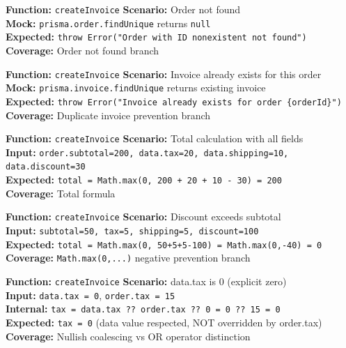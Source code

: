 \documentclass[12pt,a4paper]{report}
\newcommand{\ptwo}{\textbf{\color{p2orange}P2}}
\begin{document}
\begin{tcolorbox}[testbox,title={INV-004 \hfill \ptwo}]
\textbf{Function:} \texttt{createInvoice} \quad \textbf{Scenario:} Order not found \\
\textbf{Mock:} \texttt{prisma.order.findUnique} returns \texttt{null} \\
\textbf{Expected:} \texttt{throw Error("Order with ID nonexistent not found")} \\
\textbf{Coverage:} Order not found branch
\end{tcolorbox}

\begin{tcolorbox}[criticalbox,title={INV-005 \hfill \ptwo\ --- Duplicate Invoice}]
\textbf{Function:} \texttt{createInvoice} \quad \textbf{Scenario:} Invoice already exists for this order \\
\textbf{Mock:} \texttt{prisma.invoice.findUnique} returns existing invoice \\
\textbf{Expected:} \texttt{throw Error("Invoice already exists for order \{orderId\}")} \\
\textbf{Coverage:} Duplicate invoice prevention branch
\end{tcolorbox}

\begin{tcolorbox}[testbox,title={INV-006 \hfill \ptwo}]
\textbf{Function:} \texttt{createInvoice} \quad \textbf{Scenario:} Total calculation with all fields \\
\textbf{Input:} \texttt{order.subtotal=200, data.tax=20, data.shipping=10, data.discount=30} \\
\textbf{Expected:} \texttt{total = Math.max(0, 200 + 20 + 10 - 30) = 200} \\
\textbf{Coverage:} Total formula
\end{tcolorbox}

\begin{tcolorbox}[criticalbox,title={INV-007 \hfill \ptwo\ --- Negative Total Prevention}]
\textbf{Function:} \texttt{createInvoice} \quad \textbf{Scenario:} Discount exceeds subtotal \\
\textbf{Input:} \texttt{subtotal=50, tax=5, shipping=5, discount=100} \\
\textbf{Expected:} \texttt{total = Math.max(0, 50+5+5-100) = Math.max(0,-40) = 0} \\
\textbf{Coverage:} \texttt{Math.max(0,...)} negative prevention branch
\end{tcolorbox}

\begin{tcolorbox}[criticalbox,title={INV-008 \hfill \ptwo\ --- Nullish Coalescing}]
\textbf{Function:} \texttt{createInvoice} \quad \textbf{Scenario:} data.tax is 0 (explicit zero) \\
\textbf{Input:} \texttt{data.tax = 0}, \texttt{order.tax = 15} \\
\textbf{Internal:} \texttt{tax = data.tax ?? order.tax ?? 0 = 0 ?? 15 = 0} \\
\textbf{Expected:} \texttt{tax = 0} (data value respected, NOT overridden by order.tax) \\
\textbf{Coverage:} Nullish coalescing vs OR operator distinction
\end{tcolorbox}
\end{document}
